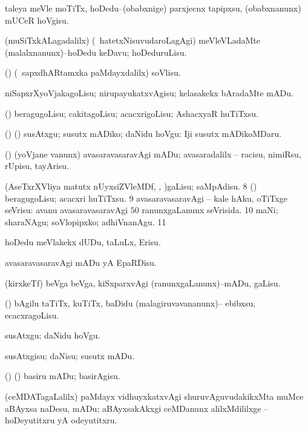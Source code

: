{{ taleya meVle moTiTx, hoDedu--(obabxnige) parxjecnx tapipxsu, (obabxnanunx) mUCeR hoVgisu. 

 (muSiTxkALagadalilx) (\sA\ hatetxNisuvudaroLagAgi) meVleVLadaMte (malalxnanunx)--hoDedu keDavu; hoDeduruLisu. 

 (\rUpa) (\kanmu\ sapxdhARtamxka paMdayxdalilx) soVlisu. 

 niSapxrXyoVjakagoLisu; nirupayukatxvAgisu; kelasakekx bAradaMte mADu. 

 (\ashi) beragugoLisu; cakitagoLisu; acacxrigoLisu; AshacxyaR huTiTxsu. 

 (\ashi) (\AtAmx) susAtxgu; susutx mADiko; daNidu hoVgu:  Iji susutx mADikoMDaru. 

 (\AmA) (yoVjane \mo vanunx) avasaravasaravAgi mADu; avasaradalilx -- racisu, nimiRsu, rUpisu, tayArisu. 

 (AseTxrXVliya matutx nUyxsiZVleMDf, \ame, \ashi)gaLisu; saMpAdisu. 
\num{8}  (\AmA) beragugoLisu; acacxri huTiTxsu. 
\num{9}  avasaravasaravAgi -- kale hAku, oTiTxge seVrisu: 
avanu avasaravasaravAgi $50$ ranunxgaLanunx seVrisida. 
\num{10}  maNi; sharaNAgu; soVlopipxko; adhiVnanAgu. 
\num{11}  

 hoDedu meVlakekx dUDu, taLuLx, Erisu. 

 avasaravasaravAgi mADu yA  EpaRDisu. 

 (kirxkeTf) beVga beVga, kiSxparxvAgi (ranunxgaLanunx)--mADu, gaLisu. 

 (\birx) bAgilu taTiTx, kuTiTx, baDidu (malagiruvavananunx)-- ebibxsu, ecacxragoLisu. 

 susAtxgu; daNidu hoVgu. 

 susAtxgisu; daNisu; susutx mADu. 

 (\ame) (\ashi) basiru mADu; basirAgisu. 

 (ceMDATagaLalilx) paMdayx vidhuyxkatxvAgi shuruvAguvudakikxMta muMce aBAyxsa naDesu, mADu; aBAyxsakAkxgi ceMDanunx alilxMdililxge -- hoDeyutitxru yA odeyutitxru.}}

